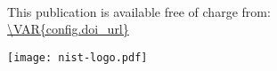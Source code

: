 
\begin{titlepage}
\begin{center}

\sffamily
\vspace{8pt}
\LARGE{\MakeUppercase{\textbf{}}}\\
\vspace{8pt}
\Large{}
\vfill

\normalsize This publication is available free of charge from:\\
\url{\VAR{config.doi_url}}\\
\vfill

\texttt{[image: nist-logo.pdf]}\\ 
\end{center}
\end{titlepage}
